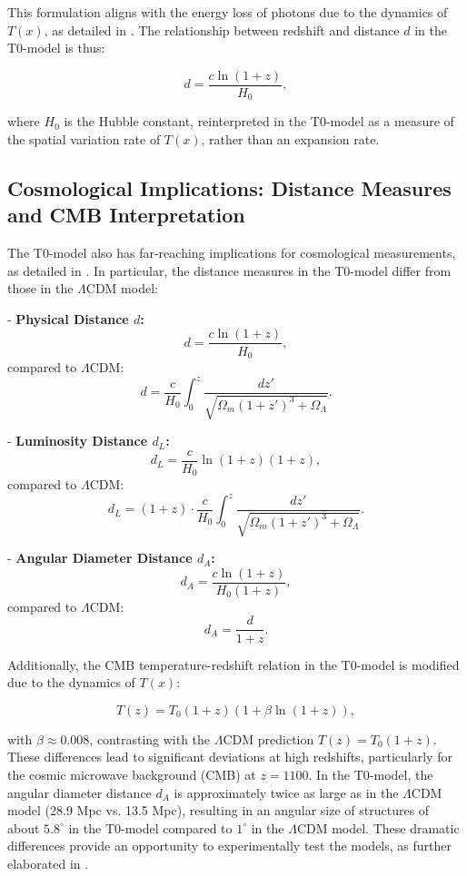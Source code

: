 \documentclass[a4paper,12pt]{article}
\newcommand{\Tfield}{T(x)}
\begin{document}
	This formulation aligns with the energy loss of photons due to the dynamics of \( \Tfield \), as detailed in \cite{pascher_messdifferenzen_2025}. The relationship between redshift and distance \( d \) in the T0-model is thus:
	
	\begin{equation}
		d = \frac{c \ln(1 + z)}{H_0},
	\end{equation}
	
	where \( H_0 \) is the Hubble constant, reinterpreted in the T0-model as a measure of the spatial variation rate of \( \Tfield \), rather than an expansion rate.
	
	\subsection{Cosmological Implications: Distance Measures and CMB Interpretation}
	
	The T0-model also has far-reaching implications for cosmological measurements, as detailed in \cite{pascher_messdifferenzen_2025}. In particular, the distance measures in the T0-model differ from those in the \(\Lambda\)CDM model:
	
	- \textbf{Physical Distance \( d \):}
	\[
	d = \frac{c \ln(1 + z)}{H_0},
	\]
	compared to \(\Lambda\)CDM:
	\[
	d = \frac{c}{H_0} \int_0^z \frac{dz'}{\sqrt{\Omega_m (1 + z')^3 + \Omega_\Lambda}}.
	\]
	
	- \textbf{Luminosity Distance \( d_L \):}
	\[
	d_L = \frac{c}{H_0} \ln(1 + z) (1 + z),
	\]
	compared to \(\Lambda\)CDM:
	\[
	d_L = (1 + z) \cdot \frac{c}{H_0} \int_0^z \frac{dz'}{\sqrt{\Omega_m (1 + z')^3 + \Omega_\Lambda}}.
	\]
	
	- \textbf{Angular Diameter Distance \( d_A \):}
	\[
	d_A = \frac{c \ln(1 + z)}{H_0 (1 + z)},
	\]
	compared to \(\Lambda\)CDM:
	\[
	d_A = \frac{d}{1 + z}.
	\]
	
	Additionally, the CMB temperature-redshift relation in the T0-model is modified due to the dynamics of \( \Tfield \):
	
	\begin{equation}
		T(z) = T_0 (1 + z) (1 + \beta \ln(1 + z)),
	\end{equation}
	
	with \( \beta \approx 0.008 \), contrasting with the \(\Lambda\)CDM prediction \( T(z) = T_0 (1 + z) \). These differences lead to significant deviations at high redshifts, particularly for the cosmic microwave background (CMB) at \( z = 1100 \). In the T0-model, the angular diameter distance \( d_A \) is approximately twice as large as in the \(\Lambda\)CDM model (28.9 Mpc vs. 13.5 Mpc), resulting in an angular size of structures of about \( 5.8^\circ \) in the T0-model compared to \( 1^\circ \) in the \(\Lambda\)CDM model. These dramatic differences provide an opportunity to experimentally test the models, as further elaborated in \cite{pascher_messdifferenzen_2025}.
	
\end{document}

